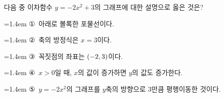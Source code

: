 다음 중 이차함수 $y=-2x^2+3$의 그래프에 대한 설명으로 옳은 것은?
\par\medskip\par\noindent\hangindent=1.4em {\small ①}\ 아래로 볼록한 포물선이다.\par\noindent\hangindent=1.4em {\small ②}\ 축의 방정식은 $x=3$이다.\par\noindent\hangindent=1.4em {\small ③}\ 꼭짓점의 좌표는 $(-2{,}\mkern3mu\mathopen{}3)$이다.\par\noindent\hangindent=1.4em {\small ④}\ $x>0$일 때, $x$의 값이 증가하면 $y$의 값도 증가한다.\par\noindent\hangindent=1.4em {\small ⑤}\ $y=-2x^2$의 그래프를 $y$축의 방향으로 $3$만큼 평행이동한 것이다.\par\medskip
